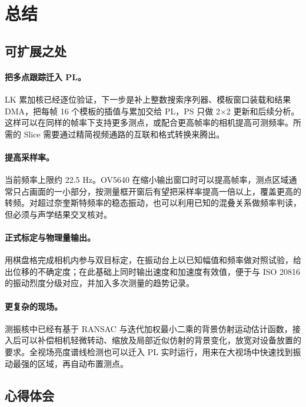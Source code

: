 \section{总结}

\subsection{可扩展之处}

\paragraph{把多点跟踪迁入 PL。}LK 累加核已经逐位验证，下一步是补上整数搜索序列器、模板窗口装载和结果 DMA，把每帧 16 个模板的插值与累加交给 PL，PS 只做 2×2 更新和后续分析。这样可以在同样的帧率下支持更多测点，或配合更高帧率的相机提高可测频率。所需的 Slice 需要通过精简视频通路的互联和格式转换来腾出。

\paragraph{提高采样率。}当前频率上限约 22.5 Hz。OV5640 在缩小输出窗口时可以提高帧率，测点区域通常只占画面的一小部分，按测量框开窗后有望把采样率提高一倍以上，覆盖更高的转频。对超过奈奎斯特频率的稳态振动，也可以利用已知的混叠关系做频率判读，但必须与声学结果交叉核对。

\paragraph{正式标定与物理量输出。}用棋盘格完成相机内参与双目标定，在振动台上以已知幅值和频率做对照试验，给出位移的不确定度；在此基础上同时输出速度和加速度有效值，便于与 ISO 20816 的振动烈度分级对应，并加入多次测量的趋势记录。

\paragraph{更复杂的现场。}测振核中已经有基于 RANSAC 与迭代加权最小二乘的背景仿射运动估计函数，接入后可以补偿相机轻微转动、缩放及局部近似仿射的背景变化，放宽对设备放置的要求。全视场亮度谱线检测也可以迁入 PL 实时运行，用来在大视场中快速找到振动最强的区域，再自动布置测点。


\subsection{心得体会}

